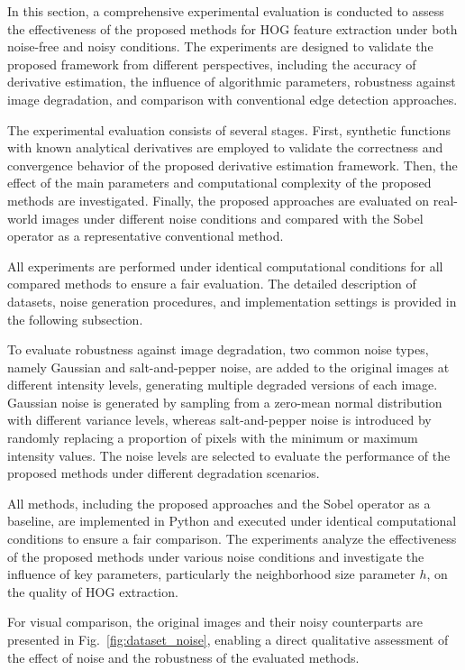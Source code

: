 \documentclass{elsarticle}
\begin{document}
In this section, a comprehensive experimental evaluation is conducted to assess the effectiveness of the proposed methods for HOG feature extraction under both noise-free and noisy conditions. The experiments are designed to validate the proposed framework from different perspectives, including the accuracy of derivative estimation, the influence of algorithmic parameters, robustness against image degradation, and comparison with conventional edge detection approaches.

The experimental evaluation consists of several stages. First, synthetic functions with known analytical derivatives are employed to validate the correctness and convergence behavior of the proposed derivative estimation framework. Then, the effect of the main parameters and computational complexity of the proposed methods are investigated. Finally, the proposed approaches are evaluated on real-world images under different noise conditions and compared with the Sobel operator as a representative conventional method.

All experiments are performed under identical computational conditions for all compared methods to ensure a fair evaluation. The detailed description of datasets, noise generation procedures, and implementation settings is provided in the following subsection.

To evaluate robustness against image degradation, two common noise types, namely Gaussian and salt-and-pepper noise, are added to the original images at different intensity levels, generating multiple degraded versions of each image. Gaussian noise is generated by sampling from a zero-mean normal distribution with different variance levels, whereas salt-and-pepper noise is introduced by randomly replacing a proportion of pixels with the minimum or maximum intensity values. The noise levels are selected to evaluate the performance of the proposed methods under different degradation scenarios.

All methods, including the proposed approaches and the Sobel operator as a baseline, are implemented in Python and executed under identical computational conditions to ensure a fair comparison. The experiments analyze the effectiveness of the proposed methods under various noise conditions and investigate the influence of key parameters, particularly the neighborhood size parameter $h$, on the quality of HOG extraction.

For visual comparison, the original images and their noisy counterparts are presented in Fig.~\ref{fig:dataset_noise}, enabling a direct qualitative assessment of the effect of noise and the robustness of the evaluated methods.
\end{document}
